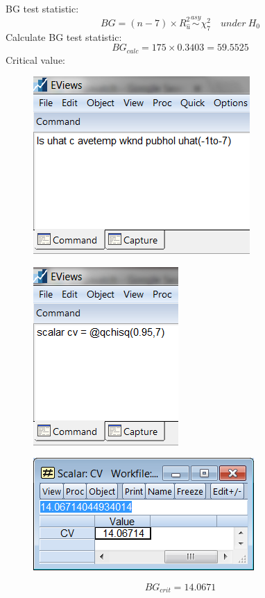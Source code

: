 \documentclass[12pt]{report}
\begin{document}
\noindent BG test statistic: 
$$BG = (n-7)\times R^2_{\hat{u}} \overset{asy}{\sim} \chi^2_7 \quad under\ H_0$$
\noindent Calculate BG test statistic: 
$$BG_{calc} = 175\times 0.3403 = 59.5525$$
\noindent Critical value: 
\begin{figure}[H]
	\centerline{\includegraphics{tute10_6}}
\end{figure}
\vspace{-\baselineskip}
\begin{figure}[H]
	\centerline{\includegraphics{tute10_7}}
\end{figure}
\vspace{-\baselineskip}
\begin{figure}[H]
	\centerline{\includegraphics{tute10_8}}
\end{figure}
\vspace{-\baselineskip}
$$BG_{crit} = 14.0671$$
\end{document}
